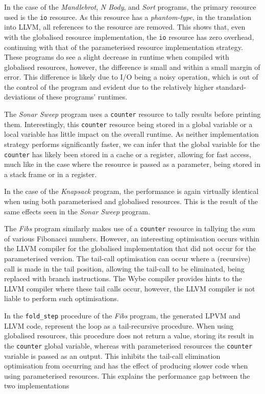 In the case of the \textit{Mandlebrot}, \textit{N Body}, and \textit{Sort} programs, the primary resource used is the \texttt{io} resource. As this resource has a \textit{phantom-type}, in the translation into LLVM, all references to the resource are removed. This shows that, even with the globalised resource implementation, the \texttt{io} resource has zero overhead, continuing with that of the parameterised resource implementation strategy. These programs do see a slight decrease in runtime when compiled with globalised resources, however, the difference is small and within a small margin of error. This difference is likely due to I/O being a noisy operation, which is out of the control of the program and evident due to the relatively higher standard-deviations of these programs' runtimes.

The \textit{Sonar Sweep} program uses a \texttt{counter} resource to tally results before printing them. Interestingly, this \texttt{counter} resource being stored in a global variable or a local variable has little impact on the overall runtime. As neither implementation strategy performs significantly faster, we can infer that the global variable for the \texttt{counter} has likely been stored in a cache or a register, allowing for fast access, much like in the case where the resource is passed as a parameter, being stored in a stack frame or in a register.

In the case of the \textit{Knapsack} program, the performance is again virtually identical when using both parameterised and globalised resources. This is the result of the same effects seen in the \textit{Sonar Sweep} program.

The \textit{Fibs} program similarly makes use of a \texttt{counter} resource in tallying the sum of various Fibonacci numbers. However, an interesting optimisation occurs within the LLVM compiler for the globalised implementation that did not occur for the parameterised version. The tail-call optimisation can occur where a (recursive) call is made in the tail position, allowing the tail-call to be eliminated, being replaced with branch instructions. The Wybe compiler provides hints to the LLVM compiler where these tail calls occur, however, the LLVM compiler is not liable to perform such optimisations. 

In the \texttt{fold\_step} procedure of the \textit{Fibs} program, the generated LPVM and LLVM code, represent the loop as a tail-recursive procedure. When using globalised resources, this procedure does not return a value, storing its result in the \texttt{counter} global variable, whereas with parameterised resources the \texttt{counter} variable is passed as an output. This inhibits the tail-call elimination optimisation from occurring and has the effect of producing slower code when using parameterised resources. This explains the performance gap between the two implementations
